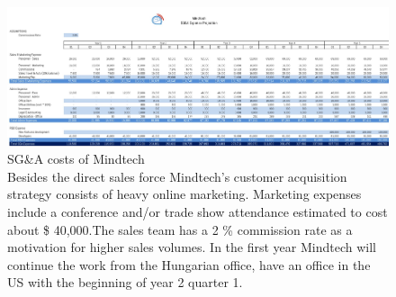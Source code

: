 \documentclass[letterpaper,10pt]{article}
\begin{document}
\begin{appendices}

\begin{landscape}
\begin{figure}[!htb]
\centering
\includegraphics[scale=0.5]{sga-1.jpg}
\caption[SG&A costs of Mindtech]{SG&A costs of Mindtech \\ Besides the direct sales force Mindtech's customer acquisition strategy consists of heavy online marketing. Marketing expenses include a conference and/or trade show attendance estimated to cost about \$ 40,000.The sales team has a 2 \% commission rate as a motivation for higher sales volumes. In the first year Mindtech will continue the work from the Hungarian office, have an office in the US with the beginning of year 2 quarter 1.}
\end{figure}
\end{landscape}


\end{appendices}
\end{document}
